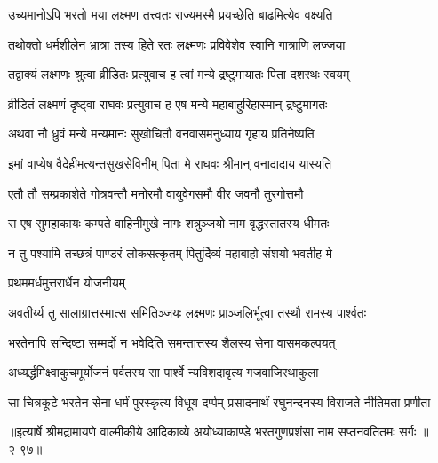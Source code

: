 \twolineshloka
{उच्यमानोऽपि भरतो मया लक्ष्मण तत्त्वतः}
{राज्यमस्मै प्रयच्छेति बाढमित्येव वक्ष्यति} %

\twolineshloka
{तथोक्तो धर्मशीलेन भ्रात्रा तस्य हिते रतः}
{लक्ष्मणः प्रविवेशेव स्वानि गात्राणि लज्जया} %

\twolineshloka
{तद्वाक्यं लक्ष्मणः श्रुत्वा व्रीडितः प्रत्युवाच ह}
{त्वां मन्ये द्रष्टुमायातः पिता दशरथः स्वयम्} %

\twolineshloka
{व्रीडितं लक्ष्मणं दृष्ट्वा राघवः प्रत्युवाच ह}
{एष मन्ये महाबाहुरिहास्मान् द्रष्टुमागतः} %

\twolineshloka
{अथवा नौ ध्रुवं मन्ये मन्यमानः सुखोचितौ}
{वनवासमनुध्याय गृहाय प्रतिनेष्यति} %

\twolineshloka
{इमां वाप्येष वैदेहीमत्यन्तसुखसेविनीम्}
{पिता मे राघवः श्रीमान् वनादादाय यास्यति} %

\twolineshloka
{एतौ तौ सम्प्रकाशेते गोत्रवन्तौ मनोरमौ}
{वायुवेगसमौ वीर जवनौ तुरगोत्तमौ} %

\twolineshloka
{स एष सुमहाकायः कम्पते वाहिनीमुखे}
{नागः शत्रुञ्जयो नाम वृद्धस्तातस्य धीमतः} %

\twolineshloka
{न तु पश्यामि तच्छत्रं पाण्डरं लोकसत्कृतम्}
{पितुर्दिव्यं महाबाहो संशयो भवतीह मे} %

\onelineshloka
{प्रथममर्धमुत्तरार्धेन योजनीयम्} %

\twolineshloka
{अवतीर्य्य तु सालाग्रात्तस्मात्स समितिञ्जयः}
{लक्ष्मणः प्राञ्जलिर्भूत्वा तस्थौ रामस्य पार्श्वतः} %

\twolineshloka
{भरतेनापि सन्दिष्टा सम्मर्दो न भवेदिति}
{समन्तात्तस्य शैलस्य सेना वासमकल्पयत्} %

\twolineshloka
{अध्यर्द्धमिक्ष्वाकुचमूर्योजनं पर्वतस्य सा}
{पार्श्वे न्यविशदावृत्य गजवाजिरथाकुला} %

\twolineshloka
{सा चित्रकूटे भरतेन सेना धर्मं पुरस्कृत्य विधूय दर्प्पम्}
{प्रसादनार्थं रघुनन्दनस्य विराजते नीतिमता प्रणीता} %


॥इत्यार्षे श्रीमद्रामायणे वाल्मीकीये आदिकाव्ये अयोध्याकाण्डे भरतगुणप्रशंसा नाम सप्तनवतितमः सर्गः ॥२-९७॥
